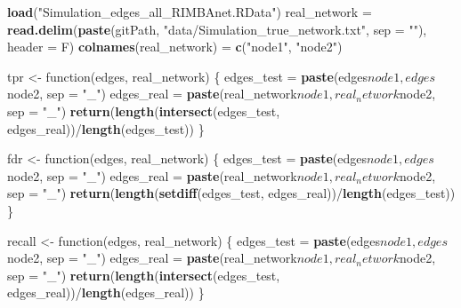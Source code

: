 \documentclass[]{article}
\newenvironment{Shaded}{\begin{snugshade}}{\end{snugshade}}
\newcommand{\KeywordTok}[1]{\textcolor[rgb]{0.13,0.29,0.53}{\textbf{{#1}}}}
\newcommand{\DataTypeTok}[1]{\textcolor[rgb]{0.13,0.29,0.53}{{#1}}}
\newcommand{\StringTok}[1]{\textcolor[rgb]{0.31,0.60,0.02}{{#1}}}
\newcommand{\NormalTok}[1]{{#1}}
\begin{document}
\begin{Shaded}
\begin{Highlighting}[]
\KeywordTok{load}\NormalTok{(}\StringTok{"Simulation_edges_all_RIMBAnet.RData"}\NormalTok{)}
\NormalTok{real_network =}\StringTok{ }\KeywordTok{read.delim}\NormalTok{(}\KeywordTok{paste}\NormalTok{(gitPath, }\StringTok{"data/Simulation_true_network.txt"}\NormalTok{, }
    \DataTypeTok{sep =} \StringTok{""}\NormalTok{), }\DataTypeTok{header =} \NormalTok{F)}
\KeywordTok{colnames}\NormalTok{(real_network) =}\StringTok{ }\KeywordTok{c}\NormalTok{(}\StringTok{"node1"}\NormalTok{, }\StringTok{"node2"}\NormalTok{)}

\NormalTok{tpr <-}\StringTok{ }\NormalTok{function(edges, real_network) \{}
    \NormalTok{edges_test =}\StringTok{ }\KeywordTok{paste}\NormalTok{(edges$node1, edges$node2, }\DataTypeTok{sep =} \StringTok{"_"}\NormalTok{)}
    \NormalTok{edges_real =}\StringTok{ }\KeywordTok{paste}\NormalTok{(real_network$node1, real_network$node2, }
        \DataTypeTok{sep =} \StringTok{"_"}\NormalTok{)}
    \KeywordTok{return}\NormalTok{(}\KeywordTok{length}\NormalTok{(}\KeywordTok{intersect}\NormalTok{(edges_test, edges_real))/}\KeywordTok{length}\NormalTok{(edges_test))}
\NormalTok{\}}

\NormalTok{fdr <-}\StringTok{ }\NormalTok{function(edges, real_network) \{}
    \NormalTok{edges_test =}\StringTok{ }\KeywordTok{paste}\NormalTok{(edges$node1, edges$node2, }\DataTypeTok{sep =} \StringTok{"_"}\NormalTok{)}
    \NormalTok{edges_real =}\StringTok{ }\KeywordTok{paste}\NormalTok{(real_network$node1, real_network$node2, }
        \DataTypeTok{sep =} \StringTok{"_"}\NormalTok{)}
    \KeywordTok{return}\NormalTok{(}\KeywordTok{length}\NormalTok{(}\KeywordTok{setdiff}\NormalTok{(edges_test, edges_real))/}\KeywordTok{length}\NormalTok{(edges_test))}
\NormalTok{\}}

\NormalTok{recall <-}\StringTok{ }\NormalTok{function(edges, real_network) \{}
    \NormalTok{edges_test =}\StringTok{ }\KeywordTok{paste}\NormalTok{(edges$node1, edges$node2, }\DataTypeTok{sep =} \StringTok{"_"}\NormalTok{)}
    \NormalTok{edges_real =}\StringTok{ }\KeywordTok{paste}\NormalTok{(real_network$node1, real_network$node2, }
        \DataTypeTok{sep =} \StringTok{"_"}\NormalTok{)}
    \KeywordTok{return}\NormalTok{(}\KeywordTok{length}\NormalTok{(}\KeywordTok{intersect}\NormalTok{(edges_test, edges_real))/}\KeywordTok{length}\NormalTok{(edges_real))}
\NormalTok{\}}


\end{Highlighting}
\end{Shaded}
\end{document}
